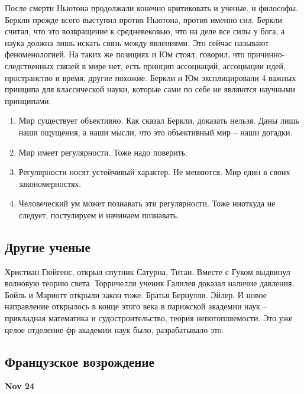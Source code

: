 \documentclass[a4paper, 12pt]{article}
\begin{document}
После смерти Ньютона продолжали конечно критиковать и ученые, 
и философы. Беркли прежде всего выступил против Ньютона, против именно 
сил. Беркли считал, что это возвращение к средневековью, что на деле все 
силы у бога, а наука должна лишь искать связь между явлениями. Это 
сейчас называют феноменологией. На таких же позициях и Юм стоял, 
говорил, что причинно-следственных связей в мире нет, есть принцип 
ассоциаций, ассоциации идей, пространство и время, другие похожие. 
Беркли и Юм эксплицировали 4 важных принципа для классической науки, 
которые сами по себе не являются научными принципами.
\begin{enumerate}
\item Мир существует объективно. Как сказал Беркли, доказать нельзя. 
  Даны лишь наши ощущения, а наши мысли, что это объективный мир -- наши 
  догадки.
\item Мир имеет регулярности. Тоже надо поверить.
\item Регулярности носят устойчивый характер. Не меняются. Мир един 
  в своих закономерностях.
\item Человеческий ум может познавать эти регулярности. Тоже ниоткуда не 
  следует, постулируем и начинаем познавать.
\end{enumerate}


\subsection{Другие ученые}

Христиан Гюйгенс, открыл спутник Сатурна, Титан. Вместе с Гуком выдвинул 
волновую теорию света. Торричелли ученик Галилея доказал наличие 
давления. Бойль и Мариотт открыли закон тоже. Братья Бернулли. Эйлер. 
И новое направление открылось в конце этого века в парижской академии 
наук -- прикладная математика и судостроительство, теория 
непотопляемости. Это уже целое отделение фр академии наук было, 
разрабатывало это.


\subsection{Французское возрождение}

\hfill \textbf{Nov 24}
\end{document}
